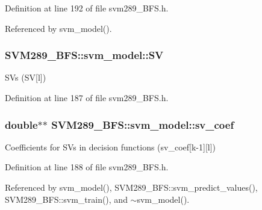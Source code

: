 Definition at line 192 of file svm289\+\_\+\+B\+F\+S.\+h.



Referenced by svm\+\_\+model().

\subsubsection[{\texorpdfstring{SV}{SV}}]{ S\+V\+M289\+\_\+\+B\+F\+S\+::svm\+\_\+model\+::\+SV}\hypertarget{struct_s_v_m289___b_f_s_1_1svm__model_a0be330087c161794b8127ebaf8efa51b}{}\label{struct_s_v_m289___b_f_s_1_1svm__model_a0be330087c161794b8127ebaf8efa51b}
S\+Vs (SV\mbox{[}l\mbox{]}) 

Definition at line 187 of file svm289\+\_\+\+B\+F\+S.\+h.

\subsubsection[{\texorpdfstring{sv\+\_\+coef}{sv_coef}}]{\setlength{\rightskip}{0pt plus 5cm}double$\ast$$\ast$ S\+V\+M289\+\_\+\+B\+F\+S\+::svm\+\_\+model\+::sv\+\_\+coef}\hypertarget{struct_s_v_m289___b_f_s_1_1svm__model_aad74e2dda9d5517b2b04d7d82b5e8e5c}{}\label{struct_s_v_m289___b_f_s_1_1svm__model_aad74e2dda9d5517b2b04d7d82b5e8e5c}
Coefficients for S\+Vs in decision functions (sv\+\_\+coef\mbox{[}k-\/1\mbox{]}\mbox{[}l\mbox{]}) 

Definition at line 188 of file svm289\+\_\+\+B\+F\+S.\+h.



Referenced by svm\+\_\+model(), S\+V\+M289\+\_\+\+B\+F\+S\+::svm\+\_\+predict\+\_\+values(), S\+V\+M289\+\_\+\+B\+F\+S\+::svm\+\_\+train(), and $\sim$svm\+\_\+model().

